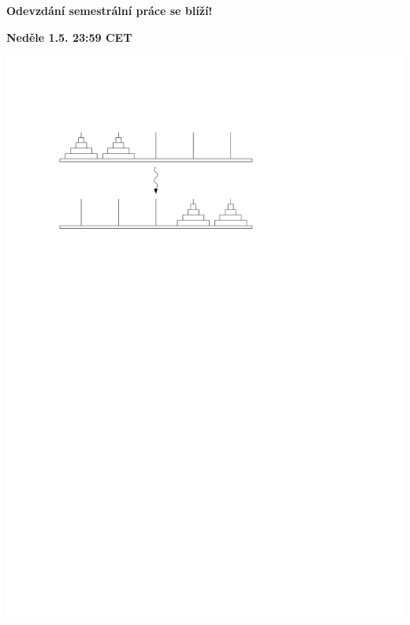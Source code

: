 \documentclass[usenames,dvipsnames,9pt]{beamer}
\begin{document}
\begin{frame}[standout]
  \begin{minipage}{0.4\linewidth}
    \begin{center}
      \textbf{\LARGE Odevzdání semestrální práce se blíží!}
    \end{center}

    \vspace{3em}

    \begin{center}
      \textbf{Neděle 1.5. 23:59 CET}
    \end{center}

  \end{minipage}
  \hfill
  \begin{minipage}{0.5\linewidth}
    \vspace{.3em}
    \centering\includegraphics[width=\linewidth]{10/figs/hanoi.pdf}

  \end{minipage}

  \vspace{3em}



\end{frame}
\end{document}

